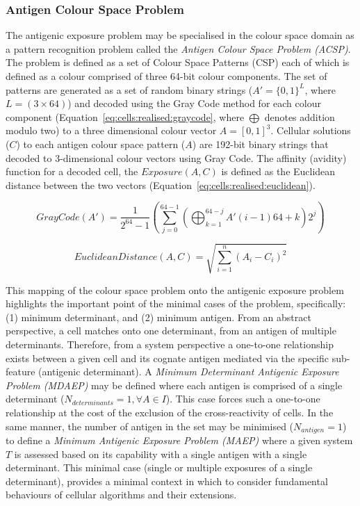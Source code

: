 %
%
\subsubsection{Antigen Colour Space Problem}
The antigenic exposure problem may be specialised in the colour space domain as a pattern recognition problem called the \emph{Antigen Colour Space Problem (ACSP)}. The problem is defined as a set of Colour Space Patterns (CSP) each of which is defined as a colour comprised of three 64-bit colour components. The set of patterns are generated as a set of random binary strings ($A\prime = \{0,1\}^{L}$, where $L=(3\times64)$) and decoded using the Gray Code method for each colour component (Equation~\ref{eq:cells:realised:graycode}, where $\bigoplus $ denotes addition modulo two) to a three dimensional colour vector $A = [0,1]^{3}$. Cellular solutions ($C$) to each antigen colour space pattern ($A$) are 192-bit binary strings that decoded to 3-dimensional colour vectors using Gray Code. The affinity (avidity) function for a decoded cell, the $Exposure(A, C)$ is defined as the Euclidean distance between the two vectors (Equation~\ref{eq:cells:realised:euclidean}).

\begin{equation}
	GrayCode(A\prime) = \frac{1}{2^{64}-1} \left(\sum_{j=0}^{64-1} \left(\bigoplus_{k=1}^{64-j}A\prime(i-1) 64+k\right) 2^j\right)
	\label{eq:cells:realised:graycode}
\end{equation}

\begin{equation}
	EuclideanDistance(A, C) = \sqrt{\sum_{i=1}^n  \left(A_i - C_i\right)^2}
	\label{eq:cells:realised:euclidean}
\end{equation}

This mapping of the colour space problem onto the antigenic exposure problem highlights the important point of the minimal cases of the problem, specifically: (1) minimum determinant, and (2) minimum antigen. From an abstract perspective, a cell matches onto one determinant, from an antigen of multiple determinants. Therefore, from a system perspective a one-to-one relationship exists between a given cell and its cognate antigen mediated via the specific sub-feature (antigenic determinant). A \emph{Minimum Determinant Antigenic Exposure Problem (MDAEP)} may be defined where each antigen is comprised of a single determinant ($N_{determinants}=1, \forall A \in I$). This case forces such a one-to-one relationship at the cost of the exclusion of the cross-reactivity of cells. In the same manner, the number of antigen in the set may be minimised ($N_{antigen}=1$) to define a \emph{Minimum Antigenic Exposure Problem (MAEP)} where a given system $T$ is assessed based on its capability with a single antigen with a single determinant. This minimal case (single or multiple exposures of a single determinant), provides a minimal context in which to consider fundamental behaviours of cellular algorithms and their extensions.

